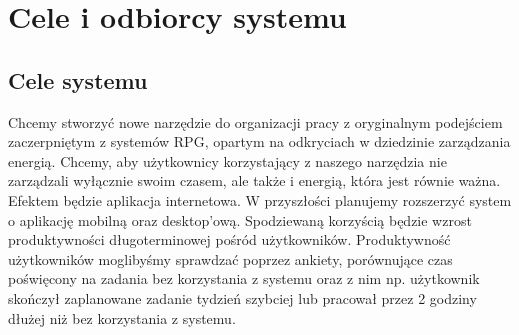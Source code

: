 \documentclass[a4paper,11pt]{report}
\begin{document}
\section {Cele i odbiorcy systemu}
\subsection {Cele systemu}
Chcemy stworzyć nowe narzędzie do organizacji pracy z oryginalnym podejściem zaczerpniętym z systemów RPG,
 opartym na odkryciach w dziedzinie zarządzania energią\cite{Harward}.
 Chcemy, aby użytkownicy korzystający z naszego narzędzia nie zarządzali wyłącznie swoim czasem,
 ale także i energią, która jest równie ważna. Efektem będzie aplikacja internetowa.
 W przyszłości planujemy rozszerzyć system o aplikację mobilną oraz desktop'ową.
 Spodziewaną korzyścią będzie wzrost produktywności długoterminowej pośród użytkowników.
 Produktywność użytkowników moglibyśmy sprawdzać poprzez ankiety,
 porównujące czas poświęcony na zadania bez korzystania z systemu oraz z nim np. użytkownik skończył
 zaplanowane zadanie tydzień szybciej lub pracował przez 2 godziny dłużej niż bez korzystania z systemu.\\
\end{document}
